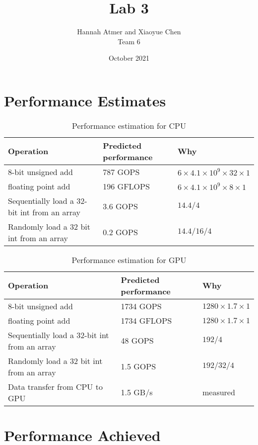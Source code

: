 \documentclass{article}
\title{Lab 3}
\author{Hannah Atmer and Xiaoyue Chen \\ Team 6}
\date{October 2021}
\begin{document}
\maketitle

\section{Performance Estimates}
  \begin{table}[h]
    \centering
    \begin{tabular}{p{}p{}p{}}
      \toprule
      Operation & Predicted performance & Why \\
      \midrule
      8-bit unsigned add & 787 GOPS & \(6 \times 4.1\times10^{9} \times 32 \times 1\) \\
      floating point add & 196 GFLOPS & \(6 \times 4.1\times10^{9} \times 8 \times 1\) \\
      Sequentially load a 32-bit int from an array & 3.6 GOPS & \(14.4 / 4\) \\
      Randomly load a 32 bit int from an array & 0.2 GOPS & \(14.4 / 16 / 4\) \\
      \bottomrule
    \end{tabular}
    \caption{Performance estimation for CPU}
  \end{table}

  \begin{table}[h]
    \centering
    \begin{tabular}{p{}p{}p{}}
      \toprule
      Operation & Predicted performance & Why \\
      \midrule
      8-bit unsigned add & 1734 GOPS & \(1280 \times 1.7 \times 1\) \\
      floating point add & 1734 GFLOPS & \(1280 \times 1.7 \times 1\) \\
      Sequentially load a 32-bit int from an array & 48 GOPS & \(192 / 4\) \\
      Randomly load a 32 bit int from an array & 1.5 GOPS & \(192 / 32
                                                            / 4\) \\
      Data transfer from CPU to GPU & 1.5 GB/s & measured \\
      \bottomrule
    \end{tabular}
    \caption{Performance estimation for GPU}
  \end{table}

\section{Performance Achieved}
\end{document}
